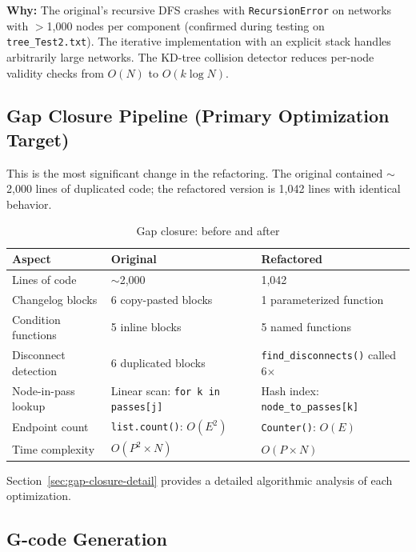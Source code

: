 \documentclass[11pt,a4paper]{article}
\begin{document}
\textbf{Why:} The original's recursive DFS crashes with \texttt{RecursionError} on networks with $>$1,000 nodes per component (confirmed during testing on \texttt{tree\_Test2.txt}). The iterative implementation with an explicit stack handles arbitrarily large networks. The KD-tree collision detector reduces per-node validity checks from $O(N)$ to $O(k \log N)$.

\subsection{Gap Closure Pipeline (Primary Optimization Target)}

This is the most significant change in the refactoring. The original contained $\sim$2,000 lines of duplicated code; the refactored version is 1,042 lines with identical behavior.

\begin{table}[H]
\centering
\caption{Gap closure: before and after}
\begin{tabularx}{\textwidth}{lXX}
\toprule
\textbf{Aspect} & \textbf{Original} & \textbf{Refactored} \\
\midrule
Lines of code & $\sim$2,000 & 1,042 \\
Changelog blocks & 6 copy-pasted blocks & 1 parameterized function \\
Condition functions & 5 inline blocks & 5 named functions \\
Disconnect detection & 6 duplicated blocks & \texttt{find\_disconnects()} called 6$\times$ \\
Node-in-pass lookup & Linear scan: \texttt{for k in passes[j]} & Hash index: \texttt{node\_to\_passes[k]} \\
Endpoint count & \texttt{list.count()}: $O(E^2)$ & \texttt{Counter()}: $O(E)$ \\
Time complexity & $O(P^2 \times N)$ & $O(P \times N)$ \\
\bottomrule
\end{tabularx}
\end{table}

Section~\ref{sec:gap-closure-detail} provides a detailed algorithmic analysis of each optimization.

\subsection{G-code Generation}
\end{document}
